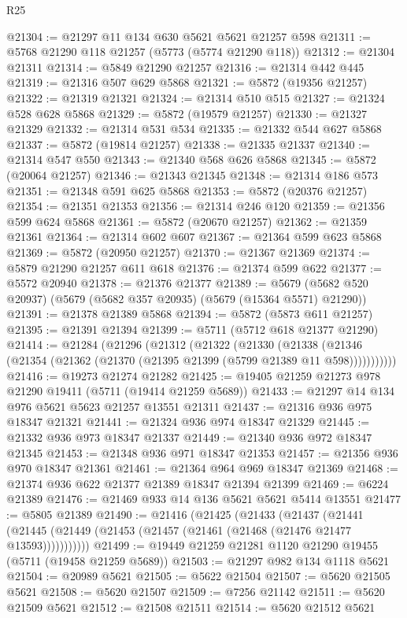 \begin{lexlean}{R25}
\begin{coremodule}
@21304 := @21297 @11 @134 @630 @5621 @5621 @21257 @598
@21311 := @5768 @21290 @118 @21257 (@5773 (@5774 @21290 @118))
@21312 := @21304 @21311
@21314 := @5849 @21290 @21257
@21316 := @21314 @442 @445
@21319 := @21316 @507 @629 @5868
@21321 := @5872 (@19356 @21257)
@21322 := @21319 @21321
@21324 := @21314 @510 @515
@21327 := @21324 @528 @628 @5868
@21329 := @5872 (@19579 @21257)
@21330 := @21327 @21329
@21332 := @21314 @531 @534
@21335 := @21332 @544 @627 @5868
@21337 := @5872 (@19814 @21257)
@21338 := @21335 @21337
@21340 := @21314 @547 @550
@21343 := @21340 @568 @626 @5868
@21345 := @5872 (@20064 @21257)
@21346 := @21343 @21345
@21348 := @21314 @186 @573
@21351 := @21348 @591 @625 @5868
@21353 := @5872 (@20376 @21257)
@21354 := @21351 @21353
@21356 := @21314 @246 @120
@21359 := @21356 @599 @624 @5868
@21361 := @5872 (@20670 @21257)
@21362 := @21359 @21361
@21364 := @21314 @602 @607
@21367 := @21364 @599 @623 @5868
@21369 := @5872 (@20950 @21257)
@21370 := @21367 @21369
@21374 := @5879 @21290 @21257 @611 @618
@21376 := @21374 @599 @622
@21377 := @5572 @20940
@21378 := @21376 @21377
@21389 := @5679 (@5682 @520 @20937) (@5679 (@5682 @357 @20935) (@5679 (@15364 @5571) @21290))
@21391 := @21378 @21389 @5868
@21394 := @5872 (@5873 @611 @21257)
@21395 := @21391 @21394
@21399 := @5711 (@5712 @618 @21377 @21290)
@21414 := @21284
    (@21296
      (@21312
        (@21322
          (@21330
            (@21338 (@21346 (@21354 (@21362 (@21370 (@21395 @21399 (@5799 @21389 @11 @598)))))))))))
@21416 := @19273 @21274 @21282
@21425 := @19405 @21259 @21273 @978 @21290 @19411 (@5711 (@19414 @21259 @5689))
@21433 := @21297 @14 @134 @976 @5621 @5623 @21257 @13551 @21311
@21437 := @21316 @936 @975 @18347 @21321
@21441 := @21324 @936 @974 @18347 @21329
@21445 := @21332 @936 @973 @18347 @21337
@21449 := @21340 @936 @972 @18347 @21345
@21453 := @21348 @936 @971 @18347 @21353
@21457 := @21356 @936 @970 @18347 @21361
@21461 := @21364 @964 @969 @18347 @21369
@21468 := @21374 @936 @622 @21377 @21389 @18347 @21394 @21399
@21469 := @6224 @21389
@21476 := @21469 @933 @14 @136 @5621 @5621 @5414 @13551
@21477 := @5805 @21389
@21490 := @21416
    (@21425
      (@21433
        (@21437
          (@21441 (@21445 (@21449 (@21453 (@21457 (@21461 (@21468 (@21476 @21477 @13593)))))))))))
@21499 := @19449 @21259 @21281 @1120 @21290 @19455 (@5711 (@19458 @21259 @5689))
@21503 := @21297 @982 @134 @1118 @5621
@21504 := @20989 @5621
@21505 := @5622 @21504
@21507 := @5620 @21505 @5621
@21508 := @5620 @21507
@21509 := @7256 @21142
@21511 := @5620 @21509 @5621
@21512 := @21508 @21511
@21514 := @5620 @21512 @5621

\end{coremodule}
\end{lexlean}
